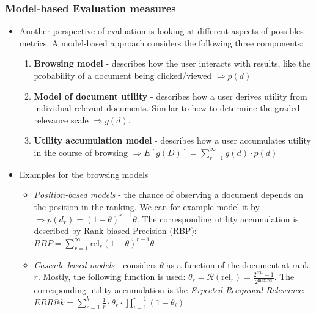 \subsubsection{Model-based Evaluation measures}
\begin{itemize}
	\item Another perspective of evaluation is looking at different aspects of possibles metrics. A model-based approach considers the following three components:
	\begin{enumerate}
		\item \textbf{Browsing model} - describes how the user interacts with results, like the probability of a document being clicked/viewed $\Rightarrow p(d)$
		\item \textbf{Model of document utility} - describes how a user derives utility from individual relevant documents. Similar to how to determine the graded relevance scale $\Rightarrow g(d)$.
		\item \textbf{Utility accumulation model} - describes how a user accumulates utility in the course of browsing $\Rightarrow E\left[g(D)\right] = \sum_{r=1}^{\infty}g(d) \cdot p(d)$
	\end{enumerate}
	\item Examples for the browsing models
	\begin{itemize}
		\item \textit{Position-based models} - the chance of observing a document depends on the position in the ranking. We can for example model it by $\Rightarrow p(d_r)=(1-\theta)^{r-1} \theta$. The corresponding utility accumulation is described by Rank-biased Precision (RBP): $RBP = \sum_{r=1}^{\infty}\text{rel}_r (1-\theta)^{r-1} \theta$
		\item \textit{Cascade-based models} - considers $\theta$ as a function of the document at rank $r$. Mostly, the following function is used: $\theta_r = \mathcal{R}(\text{rel}_r) = \frac{2^{\text{rel}_r}-1}{2^{\text{max rel}}}$. The corresponding utility accumulation is the \textit{Expected Reciprocal Relevance}: $ERR@k = \sum\limits_{r=1}^{k} \frac{1}{r} \cdot \theta_r \cdot \prod\limits_{i=1}^{r-1}\left(1 - \theta_i\right)$
	\end{itemize}
\end{itemize}
